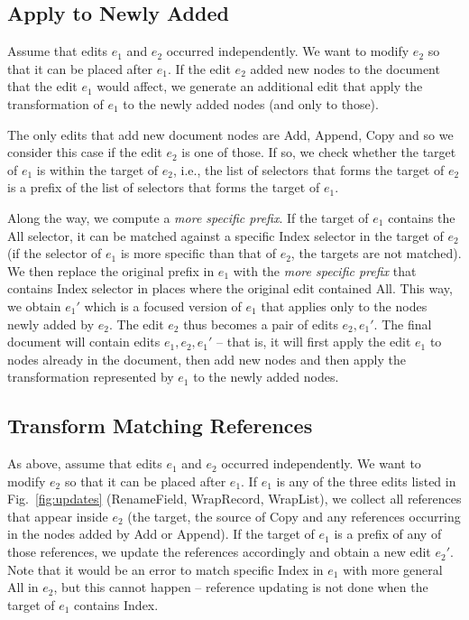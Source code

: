 \documentclass[sigconf,anonymous,screen]{acmart}
\newcommand{\ident}[1]{{\sffamily #1}}
\begin{document}
\subsection{Apply to Newly Added}
\label{app:merge-apply-to-added}

Assume that edits $e_1$ and $e_2$ occurred independently. We want to modify $e_2$ so that
it can be placed after $e_1$. If the edit $e_2$ added new nodes to the document that the
edit $e_1$ would affect, we generate an additional edit that apply the transformation of $e_1$
to the newly added nodes (and only to those).

The only edits that add new document nodes are \ident{Add}, \ident{Append}, \ident{Copy} and
so we consider this case if the edit $e_2$ is one of those. If so, we check
whether the target of $e_1$ is within the target of $e_2$, i.e., the list of selectors that
forms the target of $e_2$ is a prefix of the list of selectors that forms the target of $e_1$.

Along the way, we compute a \emph{more specific prefix}. If the target of $e_1$ contains
the \ident{All} selector, it can be matched against a specific \ident{Index} selector in the
target of $e_2$ (if the selector of $e_1$ is more specific than that of $e_2$, the targets
are not matched). We then replace the original prefix in $e_1$ with the \emph{more specific prefix}
that contains \ident{Index} selector in places where the original edit contained \ident{All}.
This way, we obtain $e_1'$ which is a focused version of $e_1$ that applies only to the
nodes newly added by $e_2$. The edit $e_2$ thus becomes a pair of edits $e_2, e_1'$.
The final document will contain edits $e_1, e_2, e_1'$ -- that is, it will first apply the edit
$e_1$ to nodes already in the document, then add new nodes and then apply the transformation
represented by $e_1$ to the newly added nodes.

\subsection{Transform Matching References}
\label{app:merge-transform-refs}

As above, assume that edits $e_1$ and $e_2$ occurred independently. We want to
modify $e_2$ so that it can be placed after $e_1$. If $e_1$ is any of the three edits
listed in Fig.~\ref{fig:updates} (\ident{RenameField}, \ident{WrapRecord}, \ident{WrapList}),
we collect all references that appear inside $e_2$ (the target, the source of \ident{Copy}
and any references occurring in the nodes added by \ident{Add} or \ident{Append}).
If the target of $e_1$ is a prefix of any of those references, we update the references
accordingly and obtain a new edit $e_2'$. Note that it would be an error to match specific
\ident{Index} in $e_1$ with more general \ident{All} in $e_2$, but this cannot happen --
reference updating is not done when the target of $e_1$ contains \ident{Index}.
\end{document}
